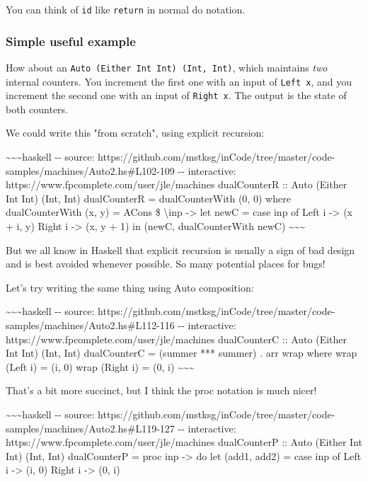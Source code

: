 \documentclass[]{article}
\begin{document}
You can think of \texttt{id} like \texttt{return} in normal do notation.

\subsubsection{Simple useful example}

How about an \texttt{Auto\ (Either\ Int\ Int)\ (Int,\ Int)}, which maintains
\emph{two} internal counters. You increment the first one with an input of
\texttt{Left\ x}, and you increment the second one with an input of
\texttt{Right\ x}. The output is the state of both counters.

We could write this "from scratch", using explicit recursion:

\textasciitilde{}\textasciitilde{}\textasciitilde{}haskell -\/- source:
https://github.com/mstksg/inCode/tree/master/code-samples/machines/Auto2.hs\#L102-109
-\/- interactive: https://www.fpcomplete.com/user/jle/machines dualCounterR ::
Auto (Either Int Int) (Int, Int) dualCounterR = dualCounterWith (0, 0) where
dualCounterWith (x, y) = ACons \$ \textbackslash{}inp -\textgreater{} let newC =
case inp of Left i -\textgreater{} (x + i, y) Right i -\textgreater{} (x, y + 1)
in (newC, dualCounterWith newC)
\textasciitilde{}\textasciitilde{}\textasciitilde{}

But we all know in Haskell that explicit recursion is usually a sign of bad
design and is best avoided whenever possible. So many potential places for bugs!

Let's try writing the same thing using Auto composition:

\textasciitilde{}\textasciitilde{}\textasciitilde{}haskell -\/- source:
https://github.com/mstksg/inCode/tree/master/code-samples/machines/Auto2.hs\#L112-116
-\/- interactive: https://www.fpcomplete.com/user/jle/machines dualCounterC ::
Auto (Either Int Int) (Int, Int) dualCounterC = (summer *** summer) . arr wrap
where wrap (Left i) = (i, 0) wrap (Right i) = (0, i)
\textasciitilde{}\textasciitilde{}\textasciitilde{}

That's a bit more succinct, but I think the proc notation is much nicer!

\textasciitilde{}\textasciitilde{}\textasciitilde{}haskell -\/- source:
https://github.com/mstksg/inCode/tree/master/code-samples/machines/Auto2.hs\#L119-127
-\/- interactive: https://www.fpcomplete.com/user/jle/machines dualCounterP ::
Auto (Either Int Int) (Int, Int) dualCounterP = proc inp -\textgreater{} do let
(add1, add2) = case inp of Left i -\textgreater{} (i, 0) Right i -\textgreater{}
(0, i)
\end{document}
